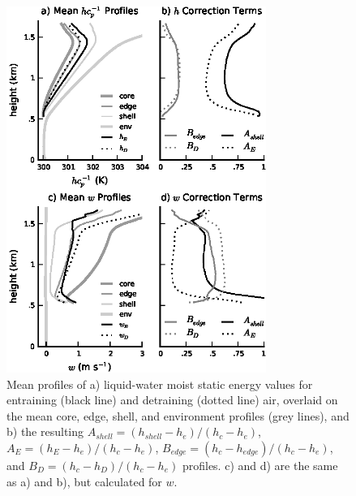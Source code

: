 \documentclass[draft,grl]{agutex}
\begin{document}
\begin{figure}
  \noindent\includegraphics[width=20pc]{./figures/profile_plots}
  \caption{Mean profiles of a) liquid-water moist static energy values for 
  entraining (black line) and detraining (dotted line) air, overlaid on the 
  mean core, edge, shell, and environment profiles (grey lines), and b) the 
  resulting $A_{shell} = (h_{shell} - h_e)/(h_c - h_e)$, 
  $A_E = (h_E - h_e)/(h_c - h_e)$,  
  $B_{edge} = (h_c - h_{edge})/(h_c - h_e)$, and
  $B_D = (h_c - h_D)/(h_c - h_e)$ profiles.  c) and d) are the same 
  as a) and b), but calculated for $w$. 
}
  \label{fig:profile_plots}
\end{figure}
\end{document}
